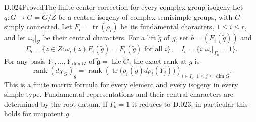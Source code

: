 \begin{saresult}{D.024}{Proved}{The finite-center correction for every complex group isogeny}
Let $q:\widetilde G\to G=\widetilde G/Z$ be a central isogeny of
complex semisimple groups, with $\widetilde G$ simply connected.
Let $F_i=\operatorname{tr}(\rho_i)$ be its fundamental characters,
$1\le i\le r$, and let $\omega_i|_Z$ be their central characters.
For a lift $\widetilde g$ of $g$, set $b=(F_i(\widetilde g))$ and
\[
 \Gamma_b=\{z\in Z:\omega_i(z)F_i(\widetilde g)
                         =F_i(\widetilde g)\text{ for all }i\},
 \quad I_b=\{i:\omega_i|_{\Gamma_b}=1\}.
\]
For any basis $Y_1,\ldots,Y_{\dim G}$ of
$\widetilde{\mathfrak g}=\operatorname{Lie}\widetilde G$, the exact rank
at $g$ is
\[
 \operatorname{rank}(d\chi_G)_g
  =\operatorname{rank}\left(
     \operatorname{tr}\bigl(\rho_i(\widetilde g)
                                  d\rho_i(Y_j)\bigr)
                    \right)_{i\in I_b,\ 1\le j\le\dim G}.     \tag{D24.1}
\]
This is a finite matrix formula for every element and every isogeny
in every simple type.  Fundamental representations and their central
characters are determined by the root datum.  If $\Gamma_b=1$ it
reduces to D.023; in particular this holds for unipotent $g$.
\end{saresult}
